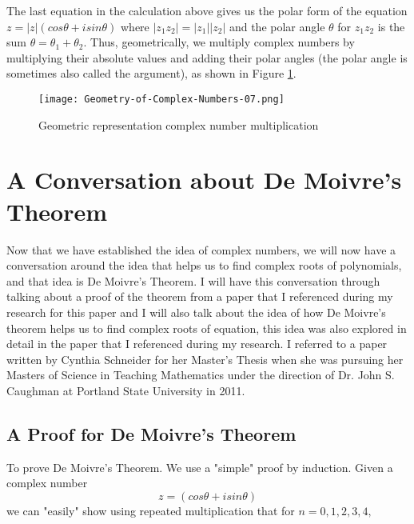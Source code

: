 \documentclass{article}
\begin{document}
The last equation in the calculation above gives us the polar form of the equation \(z = |z|(cos\theta + isin\theta)\) where \(|z_1z_2| = |z_1||z_2|\) and the polar angle $\theta$ for \(z_1z_2\) is the sum $\theta = \theta_1 + \theta_2$. Thus, geometrically, we multiply complex numbers by multiplying their absolute values and adding their polar angles (the polar angle is sometimes also called the argument\cite{highermath2024}), as shown in Figure \ref{fig:comp-prod}. 


\begin{figure}[H] 
    \centering
    \texttt{[image: Geometry-of-Complex-Numbers-07.png]}
    \caption{Geometric representation complex number multiplication\cite{byju's2024prod}}
    \label{fig:comp-prod}
\end{figure} 

\section{A Conversation about De Moivre's Theorem} 

Now that we have established the idea of complex numbers, we will now have a conversation around the idea that helps us to find complex roots of polynomials, and that idea is De Moivre's Theorem. I will have this conversation through talking about a proof of the theorem from a paper that I referenced during my research for this paper and I will also talk about the idea of how De Moivre's theorem helps us to find complex roots of equation, this idea was also explored in detail in the paper that I referenced during my research. I referred to a paper written by Cynthia Schneider for her Master's Thesis when she was pursuing her Masters of Science in Teaching Mathematics under the direction of Dr. John S. Caughman at Portland State University in 2011. 

\subsection{A Proof for De Moivre's Theorem}\cite[p.$\Tilde{16-17}$]{schneider2011moivre} 

To prove De Moivre's Theorem. We use a "simple" proof by induction. Given a complex number \[z = (cos\theta + isin\theta)\] we can "easily" show using repeated multiplication that for $n = 0,1,2,3,4,$ 
\end{document}
